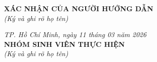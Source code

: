 \documentclass[14pt]{article}  %
\begin{document}
    
    
    \nocite{*}

    \vspace{1.5cm}
    \noindent
    \begin{minipage}[t]{0.45\textwidth}
        \centering
        \textbf{XÁC NHẬN CỦA NGƯỜI HƯỚNG DẪN}\\
        \vspace{0.1cm}
        \textit{(Ký và ghi rõ họ tên)}
    \end{minipage}%
    \hfill
    \begin{minipage}[t]{0.5\textwidth}
        \centering
        \textit{TP. Hồ Chí Minh, ngày 11 tháng 03 năm 2026}\\
        \textbf{NHÓM SINH VIÊN THỰC HIỆN}\\
        \vspace{0.1cm}
        \textit{(Ký và ghi rõ họ tên)}
    \end{minipage}
\end{document}
